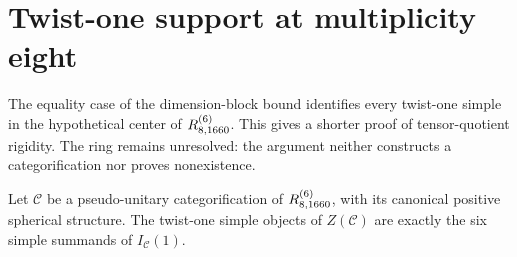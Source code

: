 \section{Twist-one support at multiplicity eight}
\label{subsec:1660-twist-one-support}

The equality case of the dimension-block bound identifies every twist-one
simple in the hypothetical center of $R^{(6)}_{8,1660}$. This gives a
shorter proof of tensor-quotient rigidity. The ring remains unresolved: the
argument neither constructs a categorification nor proves nonexistence.

\begin{proposition}\label{prop:1660-twist-one-support}
Let $\mathcal C$ be a pseudo-unitary categorification of $R^{(6)}_{8,1660}$,
with its canonical positive spherical structure. The twist-one simple
objects of $Z(\mathcal C)$ are exactly the six simple summands of
$I_{\mathcal C}(1)$.
\end{proposition}
